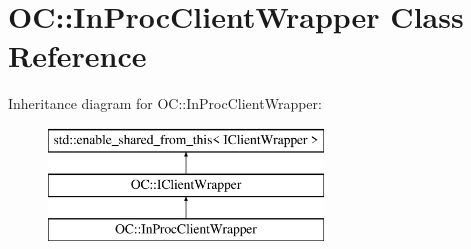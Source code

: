 \hypertarget{classOC_1_1InProcClientWrapper}{}\section{O\+C\+:\+:In\+Proc\+Client\+Wrapper Class Reference}
\label{classOC_1_1InProcClientWrapper}
Inheritance diagram for O\+C\+:\+:In\+Proc\+Client\+Wrapper\+:\begin{figure}[H]
\begin{center}
\leavevmode
\includegraphics[height=3.000000cm]{classOC_1_1InProcClientWrapper}
\end{center}
\end{figure}
